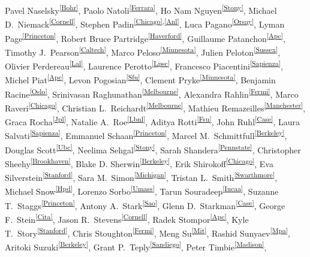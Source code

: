 \begin{raggedright}
Pavel Naselsky\textsuperscript{\ref{Bohr}},
Paolo Natoli\textsuperscript{\ref{Ferrara}},
Ho Nam Nguyen\textsuperscript{\ref{Stony}},
Michael D.~Niemack\textsuperscript{\ref{Cornell}},
Stephen Padin\textsuperscript{\ref{Chicago},\ref{Anl}},
Luca Pagano\textsuperscript{\ref{Orsay}},
Lyman Page\textsuperscript{\ref{Princeton}},
Robert Bruce Partridge\textsuperscript{\ref{Haverford}},
Guillaume Patanchon\textsuperscript{\ref{Apc}},
Timothy J.~Pearson\textsuperscript{\ref{Caltech}},
Marco Peloso\textsuperscript{\ref{Minnesota}},
Julien Peloton\textsuperscript{\ref{Sussex}},
Olivier Perdereau\textsuperscript{\ref{Lal}},
Laurence Perotto\textsuperscript{\ref{Lpsc}},
Francesco Piacentini\textsuperscript{\ref{Sapienza}},
Michel Piat\textsuperscript{\ref{Apc}},
Levon Pogosian\textsuperscript{\ref{Sfu}},
Clement Pryke\textsuperscript{\ref{Minnesota}},
Benjamin Racine\textsuperscript{\ref{Oslo}},
Srinivasan Raghunathan\textsuperscript{\ref{Melbourne}},
Alexandra Rahlin\textsuperscript{\ref{Fermi}},
Marco Raveri\textsuperscript{\ref{Chicago}},
Christian L.~Reichardt\textsuperscript{\ref{Melbourne}},
Mathieu Remazeilles\textsuperscript{\ref{Manchester}},
Graca Rocha\textsuperscript{\ref{Jpl}},
Natalie A.~Roe\textsuperscript{\ref{Lbnl}},
Aditya Rotti\textsuperscript{\ref{Fsu}},
John Ruhl\textsuperscript{\ref{Case}},
Laura Salvati\textsuperscript{\ref{Sapienza}},
Emmanuel Schaan\textsuperscript{\ref{Princeton}},
Marcel M.~Schmittfull\textsuperscript{\ref{Berkeley}},
Douglas Scott\textsuperscript{\ref{Ubc}},
Neelima Sehgal\textsuperscript{\ref{Stony}},
Sarah Shandera\textsuperscript{\ref{Pennstate}},
Christopher Sheehy\textsuperscript{\ref{Brookhaven}},
Blake D. Sherwin\textsuperscript{\ref{Berkeley}},
Erik Shirokoff\textsuperscript{\ref{Chicago}},
Eva Silverstein\textsuperscript{\ref{Stanford}},
Sara M.~Simon\textsuperscript{\ref{Michigan}},
Tristan L.~Smith\textsuperscript{\ref{Swarthmore}},
Michael Snow\textsuperscript{\ref{Hpd}},
Lorenzo Sorbo\textsuperscript{\ref{Umass}},
Tarun Souradeep\textsuperscript{\ref{Iucaa}},
Suzanne T.~Staggs\textsuperscript{\ref{Princeton}},
Antony A.~Stark\textsuperscript{\ref{Sao}},
Glenn D.~Starkman\textsuperscript{\ref{Case}},
George F.~Stein\textsuperscript{\ref{Cita}},
Jason R.~Stevens\textsuperscript{\ref{Cornell}},
Radek Stompor\textsuperscript{\ref{Apc}},
Kyle T.~Story\textsuperscript{\ref{Stanford}},
Chris Stoughton\textsuperscript{\ref{Fermi}},
Meng Su\textsuperscript{\ref{Mit}},
Rashid Sunyaev\textsuperscript{\ref{Mpa}},
Aritoki Suzuki\textsuperscript{\ref{Berkeley}},
Grant P.~Teply\textsuperscript{\ref{Sandiego}},
Peter Timbie\textsuperscript{\ref{Madison}},

\end{raggedright}
